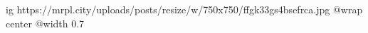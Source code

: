  
 
 
 
 

\ifcmt
  ig https://mrpl.city/uploads/posts/resize/w/750x750/ffgk33gs4bsefrca.jpg
  @wrap center
  @width 0.7
\fi
